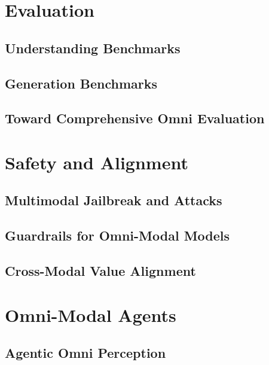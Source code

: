 \documentclass{article}
\begin{document}
\section{Evaluation}
\label{sec:evaluation}

\subsection{Understanding Benchmarks}

\subsection{Generation Benchmarks}

\subsection{Toward Comprehensive Omni Evaluation}

\section{Safety and Alignment}
\label{sec:safety}

\subsection{Multimodal Jailbreak and Attacks}

\subsection{Guardrails for Omni-Modal Models}

\subsection{Cross-Modal Value Alignment}

\section{Omni-Modal Agents}
\label{sec:agents}

\subsection{Agentic Omni Perception}
\end{document}
